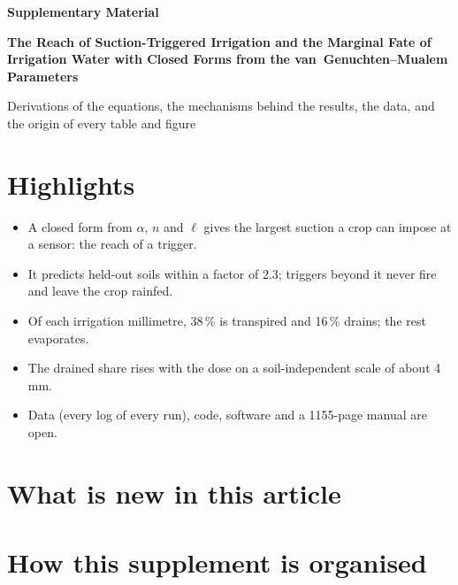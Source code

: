 
\newcommand{\hc}{h_{\mathrm{c}}}
\newcommand{\htr}{h_{\mathrm{t}}}
\renewcommand{\thesection}{S\arabic{section}}
\renewcommand{\theequation}{S\arabic{equation}}
\renewcommand{\thetable}{S\arabic{table}}
\renewcommand{\thefigure}{S\arabic{figure}}


\begin{center}{\large\bfseries Supplementary Material\par}\vspace{4pt}
{\Large\bfseries The Reach of Suction-Triggered Irrigation and the Marginal Fate of Irrigation Water with Closed Forms from the van~Genuchten--Mualem Parameters\par}\vspace{6pt}
{\normalsize Derivations of the equations, the mechanisms behind the results, the data, and the origin of every table and figure\par}\end{center}
\authorblock
\tableofcontents
\clearpage
\section{Highlights}
\begin{itemize}[nosep,leftmargin=1.2em]
\item A closed form from $\alpha$, $n$ and $\ell$ gives the largest suction a crop can impose at a sensor: the reach of a trigger.
\item It predicts held-out soils within a factor of 2.3; triggers beyond it never fire and leave the crop rainfed.
\item Of each irrigation millimetre, 38\,\% is transpired and 16\,\% drains; the rest evaporates.
\item The drained share rises with the dose on a soil-independent scale of about 4\,mm.
\item Data (every log of every run), code, software and a 1155-page manual are open.
\end{itemize}

\section{What is new in this article}


\section{How this supplement is organised}


